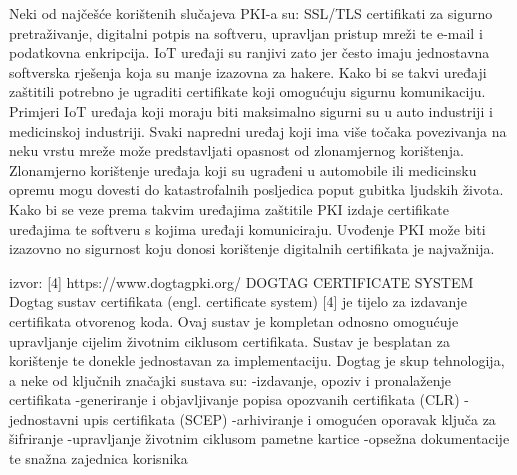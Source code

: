 \documentclass[]{foi}
\begin{document}
Neki od najčešće korištenih slučajeva PKI-a su: SSL/TLS certifikati za sigurno pretraživanje, digitalni potpis na softveru, upravljan pristup mreži te e-mail i podatkovna enkripcija.
IoT uređaji su ranjivi zato jer često imaju jednostavna softverska rješenja koja su manje izazovna za hakere. 
Kako bi se takvi uređaji zaštitili potrebno je ugraditi certifikate koji omogućuju sigurnu komunikaciju.
Primjeri IoT uređaja koji moraju biti maksimalno sigurni su u auto industriji i medicinskoj industriji.
Svaki napredni uređaj koji ima više točaka povezivanja na neku vrstu mreže može predstavljati opasnost od zlonamjernog korištenja.
Zlonamjerno korištenje uređaja koji su ugrađeni u automobile ili medicinsku opremu mogu dovesti do katastrofalnih posljedica poput gubitka ljudskih života.
Kako bi se veze prema takvim uređajima zaštitile PKI izdaje certifikate uređajima te softveru s kojima uređaji komuniciraju.
Uvođenje PKI može biti izazovno no sigurnost koju donosi korištenje digitalnih certifikata je najvažnija.

izvor: [4] https://www.dogtagpki.org/
DOGTAG CERTIFICATE SYSTEM
Dogtag sustav certifikata (engl. certificate system) [4] je tijelo za izdavanje certifikata otvorenog koda.
Ovaj sustav je kompletan odnosno omogućuje upravljanje cijelim životnim ciklusom certifikata. 
Sustav je besplatan za korištenje te donekle jednostavan za implementaciju.
Dogtag je skup tehnologija, a neke od ključnih značajki sustava su:
-izdavanje, opoziv i pronalaženje certifikata
-generiranje i objavljivanje popisa opozvanih certifikata (CLR)
-jednostavni upis certifikata (SCEP)
-arhiviranje i omogućen oporavak ključa za šifriranje
-upravljanje životnim ciklusom pametne kartice
-opsežna dokumentacije te snažna zajednica korisnika
\end{document}

